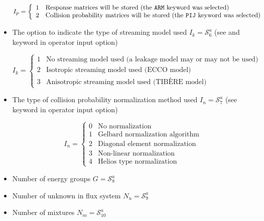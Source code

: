 \begin{itemize}
\begin{displaymath}
I_{p} = \left\{
\begin{array}{rl}
 1 & \textrm{Response matrices will be stored (the \moc{ARM} keyword was
selected)} \\
 2 & \textrm{Collision probability matrices will be stored (the \moc{PIJ} keyword was
selected)} 
\end{array} \right.
\end{displaymath}

\item The option to indicate the type of streaming model used $I_{k}=\mathcal{S}^{a}_{6}$ (see  and  
keyword in  operator input option)

\begin{displaymath}
I_{k} = \left\{
\begin{array}{rl}
 1 & \textrm{No streaming model used (a leakage model may or may not be used)} \\
 2 & \textrm{Isotropic streaming model used (ECCO model)} \\
 3 & \textrm{Anisotropic streaming model used (TIB\`ERE model)} 
\end{array} \right.
\end{displaymath}

\item The type of collision probability normalization method used $I_{n}=\mathcal{S}^{a}_{7}$ (see
  keyword in  operator input option)

\begin{displaymath}
I_{n} = \left\{
\begin{array}{rl}
 0 & \textrm{No normalization} \\
 1 & \textrm{Gelbard normalization algorithm} \\
 2 & \textrm{Diagonal element normalization} \\
 3 & \textrm{Non-linear normalization} \\
 4 & \textrm{Helios type normalization} 
\end{array} \right.
\end{displaymath}

\item Number of energy groups
$G=\mathcal{S}^{a}_{8}$
 
\item Number of unknown in flux system $N_{u}=\mathcal{S}^{a}_{9}$ 

\item Number of mixtures $N_{m}=\mathcal{S}^{a}_{10}$


\end{itemize}
